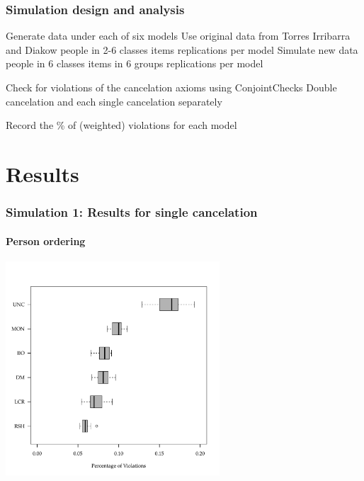 \documentclass[10pt,serif,professionalfont]{beamer}
\begin{document}
\begin{frame}
    \frametitle{Simulation design and analysis}

        \begin{outline}
        \1 Generate data under each of six models 
        \renewcommand{\outlineii}{enumerate}
            \2 Use original data from Torres Irribarra and Diakow
                 people in 2-6 classes
                 items
                 replications per model
            \2 Simulate new data 
                 people in 6 classes
                 items in 6 groups
                 replications per model
        
        \vspace{0.25cm}
        
        \1 Check for violations of the cancelation axioms using ConjointChecks
        \renewcommand{\outlineii}{itemize}
            \2 Double cancelation and each single cancelation separately

        \vspace{0.25cm}

        \1 Record the \% of (weighted) violations for each model
    \end{outline}

\end{frame}


\section{Results}

\begin{frame}
    \frametitle{Simulation 1: Results for single cancelation}
        \framesubtitle{Person ordering}

    \centering \includegraphics[width=0.6\textwidth]{./figs/sc_cols.pdf}

\end{frame}
\end{document}
